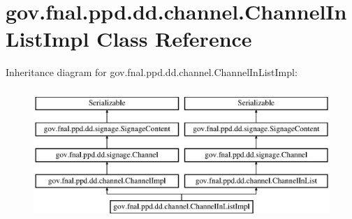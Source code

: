 \hypertarget{classgov_1_1fnal_1_1ppd_1_1dd_1_1channel_1_1ChannelInListImpl}{\section{gov.\-fnal.\-ppd.\-dd.\-channel.\-Channel\-In\-List\-Impl Class Reference}
\label{classgov_1_1fnal_1_1ppd_1_1dd_1_1channel_1_1ChannelInListImpl}
}
Inheritance diagram for gov.\-fnal.\-ppd.\-dd.\-channel.\-Channel\-In\-List\-Impl\-:\begin{figure}[H]
\begin{center}
\leavevmode
\includegraphics[height=5.000000cm]{classgov_1_1fnal_1_1ppd_1_1dd_1_1channel_1_1ChannelInListImpl}
\end{center}
\end{figure}
